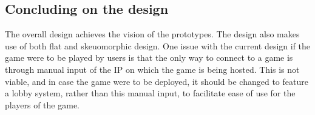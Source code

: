 \subsection{Concluding on the design}
The overall design achieves the vision of the prototypes.
The design also makes use of both flat and skeuomorphic design.
One issue with the current design if the game were to be played by users is that the only way to connect to a game is through manual input of the IP on which the game is being hosted.
This is not viable, and in case the game were to be deployed, it should be changed to feature a lobby system, rather than this manual input, to facilitate ease of use for the players of the game.
